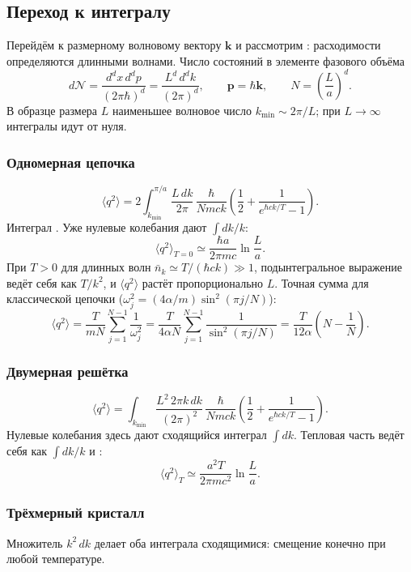 \documentclass[../final.tex]{subfiles}
\begin{document}
\subsection*{Переход к интегралу}

Перейдём к размерному волновому вектору $\boldsymbol k$ и рассмотрим
: расходимости
определяются длинными волнами. Число состояний в элементе
фазового объёма
\[
    d\mathcal N=\frac{d^dx\,d^dp}{(2\pi\hbar)^d}
       =\frac{L^d\,d^dk}{(2\pi)^d},\qquad
    \boldsymbol p=\hbar\boldsymbol k,\qquad N=\left(\frac La\right)^d.
\]
В образце размера $L$ наименьшее волновое число
$k_{\min}\sim2\pi/L$; при $L\to\infty$ интегралы идут от нуля.

\subsubsection*{Одномерная цепочка}
\[
    \langle q^2\rangle
       =2\int_{k_{\min}}^{\pi/a}\frac{L\,dk}{2\pi}\,
          \frac{\hbar}{Nmck}
          \left(\frac12+\frac1{e^{\hbar ck/T}-1}\right).
\]
Интеграл . Уже нулевые колебания
дают $\int dk/k$:
\[
    \langle q^2\rangle_{T=0}\simeq
       \frac{\hbar a}{2\pi mc}\ln\frac{L}{a}.
\]
При $T>0$ для длинных волн $\bar n_k\simeq T/(\hbar ck)\gg1$,
подынтегральное выражение ведёт себя как $T/k^2$, и
$\langle q^2\rangle$ растёт пропорционально $L$. Точная сумма для
классической цепочки ($\omega_j^2=(4\alpha/m)\sin^2(\pi j/N)$):
\[
    \langle q^2\rangle=\frac{T}{mN}\sum_{j=1}^{N-1}\frac1{\omega_j^2}
       =\frac{T}{4\alpha N}\sum_{j=1}^{N-1}\frac1{\sin^2(\pi j/N)}
       =\frac{T}{12\alpha}\left(N-\frac1N\right).
\]

\subsubsection*{Двумерная решётка}
\[
    \langle q^2\rangle
       =\int_{k_{\min}}\frac{L^2\,2\pi k\,dk}{(2\pi)^2}\,
          \frac{\hbar}{Nmck}
          \left(\frac12+\frac1{e^{\hbar ck/T}-1}\right).
\]
Нулевые колебания здесь дают сходящийся интеграл $\int dk$.
Тепловая часть ведёт себя как $\int dk/k$ и
:
\[
    \langle q^2\rangle_T\simeq\frac{a^2T}{2\pi mc^2}\ln\frac{L}{a}.
\]

\subsubsection*{Трёхмерный кристалл}
Множитель $k^2\,dk$ делает оба интеграла сходящимися:
смещение конечно при любой температуре.
\end{document}
